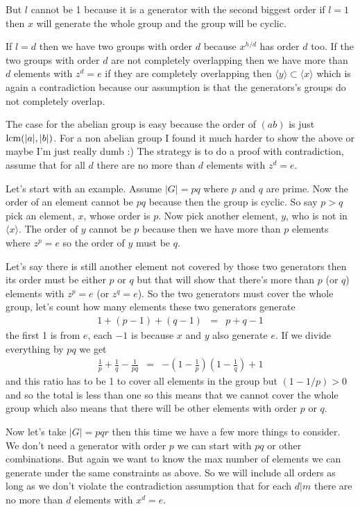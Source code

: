 \documentclass[aps,preprint,preprintnumbers,nofootinbib,showpacs,prd]{revtex4-1}
\newcommand{\nbea}{\begin{eqnarray*}}
\newcommand{\neea}{\end{eqnarray*}}
\begin{document}
But $l$ cannot be 1 because it is a generator with the second biggest order if $l = 1$ then $x$ will generate the whole group and the group will be cyclic.

If $l = d$ then we have two groups with order $d$ because $x^{h/d}$ has order $d$ too. If the two groups with order $d$ are not completely overlapping then we have more than $d$ elements with $z^d = e$ if they are completely overlapping then $\langle y \rangle \subset \langle x \rangle$ which is again a contradiction because our assumption is that the generators's groups do not completely overlap.   

The case for the abelian group is easy because the order of $(ab)$ is just ${\rm lcm}(|a|,|b|)$. For a non abelian group I found it much harder to show the above or maybe I'm just really dumb :) The strategy is to do a proof with contradiction, assume that for all $d$ there are no more than $d$ elements with $z^d = e$.  

Let's start with an example. Assume $|G| = pq$ where $p$ and $q$ are prime. Now the order of an element cannot be $pq$ because then the group is cyclic. So say $p > q$ pick an element, $x$, whose order is $p$. Now pick another element, $y$, who is not in $\langle x \rangle$. The order of $y$ cannot be $p$ because then we have more than $p$ elements where $z^p = e$ so the order of $y$ must be $q$. 

Let's say there is still another element not covered by those two generators then its order must be either $p$ or $q$ but that will show that there's more than $p$ (or $q$) elements with $z^p = e$ (or $z^q = e$). So the two generators must cover the whole group, let's count how many elements these two generators generate 
%
\nbea
1 + (p - 1) + (q - 1) & = & p + q - 1 
\neea
%
the first 1 is from $e$, each $-1$ is because $x$ and $y$ also generate $e$. If we divide everything by $pq$ we get 
%
\nbea
\frac{1}{p} + \frac{1}{q} - \frac{1}{pq} & = & -\left ( 1 - \frac{1}{p} \right ) \left ( 1 - \frac{1}{q} \right ) + 1 
\neea
% 
and this ratio has to be 1 to cover all elements in the group but $(1 - 1/p) > 0$ and so the total is less than one so this means that we cannot cover the whole group which also means that there will be other elements with order $p$ or $q$. 

Now let's take $|G| = pqr$ then this time we have a few more things to consider. We don't need a generator with order $p$ we can start with $pq$ or other combinations. But again we want to know the max number of elements we can generate under the same constraints as above. So we will include all orders as long as we don't violate the contradiction assumption that for each $d|m$ there are no more than $d$ elements with $x^d = e$. 
\end{document}
